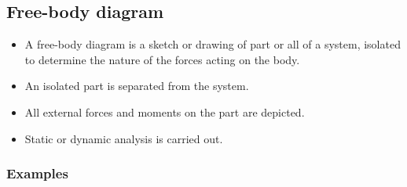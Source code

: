 \documentclass[11pt]{article}
\begin{document}
 \newpage
\subsection{Free-body diagram}
\label{sec:orgfc6fd4a}
\begin{itemize}
\item A free-body diagram is a sketch or drawing of part or all of a system, isolated to determine the nature of the forces acting on the body.
\item An isolated part is separated from the system.
\item All external forces and moments on the part are depicted.
\item Static or dynamic analysis is carried out.
\end{itemize}
\subsubsection{Examples}
\label{sec:org8aa16bd}
\end{document}
